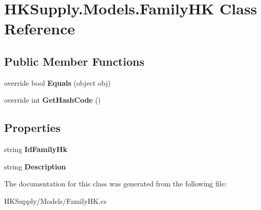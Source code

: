 \hypertarget{class_h_k_supply_1_1_models_1_1_family_h_k}{}\section{H\+K\+Supply.\+Models.\+Family\+HK Class Reference}
\label{class_h_k_supply_1_1_models_1_1_family_h_k}
\subsection*{Public Member Functions}
\begin{DoxyCompactItemize}
\item 
\mbox{\label{class_h_k_supply_1_1_models_1_1_family_h_k_a601adc4c75338825f7a4135a7421df10}} 
override bool {\bfseries Equals} (object obj)
\item 
\mbox{\label{class_h_k_supply_1_1_models_1_1_family_h_k_a6dadff1832bb75c65b07da5e5abd46ca}} 
override int {\bfseries Get\+Hash\+Code} ()
\end{DoxyCompactItemize}
\subsection*{Properties}
\begin{DoxyCompactItemize}
\item 
\mbox{\label{class_h_k_supply_1_1_models_1_1_family_h_k_a0b7cf6243999e3e78787ac3e322a4f8b}} 
string {\bfseries Id\+Family\+Hk}
\item 
\mbox{\label{class_h_k_supply_1_1_models_1_1_family_h_k_ab2be0b6ef718c971a52a1fdc1c416c4f}} 
string {\bfseries Description}
\end{DoxyCompactItemize}


The documentation for this class was generated from the following file\+:\begin{DoxyCompactItemize}
\item 
H\+K\+Supply/\+Models/Family\+H\+K.\+cs\end{DoxyCompactItemize}
